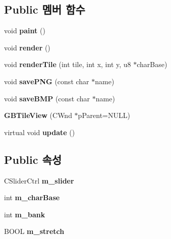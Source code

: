 \subsection*{Public 멤버 함수}
\begin{DoxyCompactItemize}
\item 
\mbox{\label{class_g_b_tile_view_aa78a471956e777509644a0a04bab2c4d}} 
void {\bfseries paint} ()
\item 
\mbox{\label{class_g_b_tile_view_a1012b77fed7304d7b27b9d619472e6a7}} 
void {\bfseries render} ()
\item 
\mbox{\label{class_g_b_tile_view_ade04081b3b047c110f6ae5673c7154ee}} 
void {\bfseries render\+Tile} (int tile, int x, int y, u8 $\ast$char\+Base)
\item 
\mbox{\label{class_g_b_tile_view_a7d48513402a49269828c3111bc153d46}} 
void {\bfseries save\+P\+NG} (const char $\ast$name)
\item 
\mbox{\label{class_g_b_tile_view_ac61ccd982b57db14794e1f9febc67c16}} 
void {\bfseries save\+B\+MP} (const char $\ast$name)
\item 
\mbox{\label{class_g_b_tile_view_a16e732a5dfc802bca970d5cf667386df}} 
{\bfseries G\+B\+Tile\+View} (C\+Wnd $\ast$p\+Parent=N\+U\+LL)
\item 
\mbox{\label{class_g_b_tile_view_a0b36c27b43fea0e457a26860b2476b9d}} 
virtual void {\bfseries update} ()
\end{DoxyCompactItemize}
\subsection*{Public 속성}
\begin{DoxyCompactItemize}
\item 
\mbox{\label{class_g_b_tile_view_ace72ce81e68876fe62cb85b09405e296}} 
C\+Slider\+Ctrl {\bfseries m\+\_\+slider}
\item 
\mbox{\label{class_g_b_tile_view_a0ad19c822952ef98ced0a46d051cb87e}} 
int {\bfseries m\+\_\+char\+Base}
\item 
\mbox{\label{class_g_b_tile_view_a765264072397d9630d2f3ae8e58c414e}} 
int {\bfseries m\+\_\+bank}
\item 
\mbox{\label{class_g_b_tile_view_afaaee0263ecf447f8c628d0bbf1ff76f}} 
B\+O\+OL {\bfseries m\+\_\+stretch}
\end{DoxyCompactItemize}
